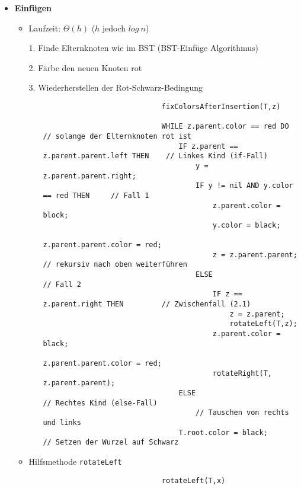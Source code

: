 \begin{itemize}
        \item \textbf{Einfügen}
            \begin{itemize}
                \item Laufzeit: $\Theta(h)$ ($h$ jedoch $log~n$)
                \item[1.] Finde Elternknoten wie im BST (BST-Einfüge Algorithmus)
                \item[2.] Färbe den neuen Knoten rot
                \item[3.] Wiederherstellen der Rot-Schwarz-Bedingung
                    \begin{itemize}
                        \item[]
                            \begin{verbatim}
                            fixColorsAfterInsertion(T,z)

                            WHILE z.parent.color == red DO                  // solange der Elternknoten rot ist
                                IF z.parent == z.parent.parent.left THEN    // Linkes Kind (if-Fall)
                                    y = z.parent.parent.right;
                                    IF y != nil AND y.color == red THEN     // Fall 1
                                        z.parent.color = block;
                                        y.color = black;
                                        z.parent.parent.color = red;
                                        z = z.parent.parent;                // rekursiv nach oben weiterführen
                                    ELSE                                    // Fall 2
                                        IF z == z.parent.right THEN         // Zwischenfall (2.1)
                                            z = z.parent;
                                            rotateLeft(T,z);
                                        z.parent.color = black;
                                        z.parent.parent.color = red;
                                        rotateRight(T, z.parent.parent);
                                ELSE                                        // Rechtes Kind (else-Fall)
                                    // Tauschen von rechts und links
                                T.root.color = black;                       // Setzen der Wurzel auf Schwarz
                            \end{verbatim}
                    \end{itemize}
\pagebreak
                \item Hilfsmethode \texttt{rotateLeft}
                    \begin{itemize}
                        \item[] 
                            \begin{verbatim}
                            rotateLeft(T,x)
                            

\end{verbatim}
\end{itemize}
\end{itemize}
\end{itemize}
